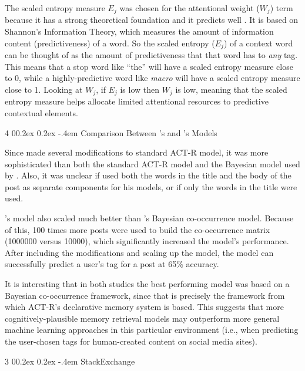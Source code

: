 \documentclass[man,floatsintext,donotrepeattitle]{apa6}
\makeatletter
\renewcommand{\subsubsection}{%
  \@startsection
  {subsubsection}%
  {3}%
  {\parindent}%
  {0\baselineskip \@plus 0.2ex \@minus 0.2ex}%
  {-.4em}%
  {\normalfont\normalsize\bfseries\addperi}}
\renewcommand{\paragraph}{%
  \@startsection
  {paragraph}%
  {4}%
  {\parindent}%
  {0\baselineskip \@plus 0.2ex \@minus 0.2ex}%
  {-.4em}%
  {\normalfont\normalsize\bfseries\itshape\addperi}}
\makeatother
\begin{document}
The scaled entropy measure $E_{j}$ was chosen for the attentional weight ($W_{j}$) term because it has a strong theoretical foundation and it predicts well \parencite{Dumais1991}.
It is based on Shannon's Information Theory, which measures the amount of information content (predictiveness) of a word.
So the scaled entropy ($E_{j}$) of a context word can be thought of as the amount of predictiveness that that word has to \emph{any} tag.
This means that a stop word like ``the'' will have a scaled entropy measure close to 0, while a highly-predictive word like \emph{macro} will have a scaled entropy measure close to 1.
Looking at $W_{j}$, if $E_{j}$ is low then $W_{j}$ is low, meaning that the scaled entropy measure helps allocate limited attentional resources to predictive contextual elements.

\paragraph{Comparison Between \citeauthor{Kuo2011}'s and \citeauthor{Stanley2013}'s Models}

Since \textcite{Stanley2013} made several modifications to standard ACT-R model, it was more sophisticated than both the standard ACT-R model and the Bayesian model used by \textcite{Kuo2011}.
Also, it was unclear if \citeauthor{Kuo2011} used both the words in the title and the body of the post as separate components for his models, or if only the words in the title were used.

\citeauthor{Stanley2013}'s model also scaled much better than \citeauthor{Kuo2011}'s Bayesian co-occurrence model. 
Because of this, 100 times more posts were used to build the co-occurrence matrix (\num{1000000} versus \num{10000}), which significantly increased the model's performance.
After including the modifications and scaling up the model, the model can successfully predict a user's tag for a post at 65\% accuracy.

It is interesting that in both studies the best performing model was based on a Bayesian co-occurrence framework, since that is precisely the framework from which ACT-R's declarative memory system is based.
This suggests that more cognitively-plausible memory retrieval models may outperform more general machine learning approaches in this particular environment
(i.e., when predicting the user-chosen tags for human-created content on social media sites).

\subsubsection{StackExchange}
\end{document}
